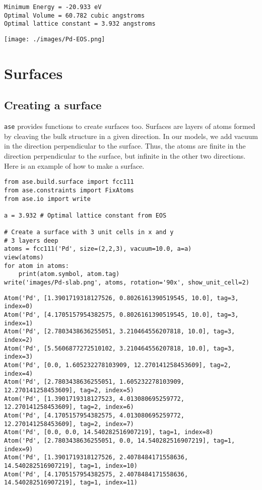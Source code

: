 \documentclass[11pt]{article}
\begin{document}
\begin{verbatim}
Minimum Energy = -20.933 eV
Optimal Volume = 60.782 cubic angstroms
Optimal lattice constant = 3.932 angstroms
\end{verbatim}

\begin{center}
\texttt{[image: ./images/Pd-EOS.png]}
\end{center}


\section{Surfaces}
\label{sec:orgf6e02e0}

\subsection{Creating a surface}
\label{sec:org4702d43}

\texttt{ase} provides functions to create surfaces too. Surfaces are layers of atoms formed by cleaving the bulk structure in a given direction. In our models, we add vacuum in the direction perpendicular to the surface. Thus, the atoms are finite in the direction perpendicular to the surface, but infinite in the other two directions. Here is an example of how to make a surface.

\begin{verbatim}
from ase.build.surface import fcc111
from ase.constraints import FixAtoms
from ase.io import write

a = 3.932 # Optimal lattice constant from EOS

# Create a surface with 3 unit cells in x and y
# 3 layers deep
atoms = fcc111('Pd', size=(2,2,3), vacuum=10.0, a=a)
view(atoms)
for atom in atoms:
    print(atom.symbol, atom.tag)
write('images/Pd-slab.png', atoms, rotation='90x', show_unit_cell=2)
\end{verbatim}

\begin{verbatim}
Atom('Pd', [1.3901719318127526, 0.8026161390519545, 10.0], tag=3, index=0)
Atom('Pd', [4.1705157954382575, 0.8026161390519545, 10.0], tag=3, index=1)
Atom('Pd', [2.7803438636255051, 3.210464556207818, 10.0], tag=3, index=2)
Atom('Pd', [5.5606877272510102, 3.210464556207818, 10.0], tag=3, index=3)
Atom('Pd', [0.0, 1.605232278103909, 12.270141258453609], tag=2, index=4)
Atom('Pd', [2.7803438636255051, 1.605232278103909, 12.270141258453609], tag=2, index=5)
Atom('Pd', [1.3901719318127523, 4.013080695259772, 12.270141258453609], tag=2, index=6)
Atom('Pd', [4.1705157954382575, 4.013080695259772, 12.270141258453609], tag=2, index=7)
Atom('Pd', [0.0, 0.0, 14.540282516907219], tag=1, index=8)
Atom('Pd', [2.7803438636255051, 0.0, 14.540282516907219], tag=1, index=9)
Atom('Pd', [1.3901719318127526, 2.4078484171558636, 14.540282516907219], tag=1, index=10)
Atom('Pd', [4.1705157954382575, 2.4078484171558636, 14.540282516907219], tag=1, index=11)
\end{verbatim}
\end{document}
